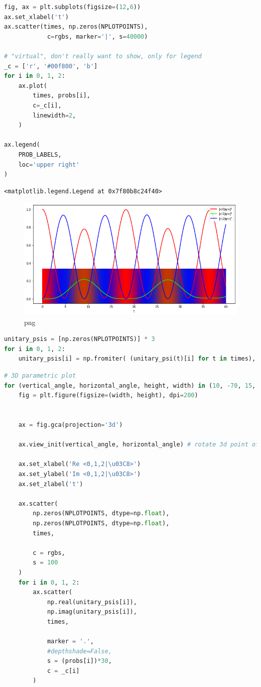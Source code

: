 \begin{lstlisting}[language=Python]
fig, ax = plt.subplots(figsize=(12,6))
ax.set_xlabel('t')
ax.scatter(times, np.zeros(NPLOTPOINTS),
            c=rgbs, marker='|', s=40000)

# "virtual", don't really want to show, only for legend
_c = ['r', '#00f800', 'b']
for i in 0, 1, 2:
    ax.plot(
        times, probs[i],
        c=_c[i],
        linewidth=2,
    )
    
ax.legend(
    PROB_LABELS,
    loc='upper right'
)
\end{lstlisting}

\begin{lstlisting}
<matplotlib.legend.Legend at 0x7f80b8c24f40>
\end{lstlisting}

\begin{figure}
\centering
\includegraphics[width=0.666\linewidth]{tex/appendix/nb/jupyter/3lev/output_20_1.png}
\caption{png}
\end{figure}

\begin{lstlisting}[language=Python]
unitary_psis = [np.zeros(NPLOTPOINTS)] * 3
for i in 0, 1, 2:
    unitary_psis[i] = np.fromiter( (unitary_psi(t)[i] for t in times), np.complex )
\end{lstlisting}

\begin{lstlisting}[language=Python]
# 3D parametric plot
for (vertical_angle, horizontal_angle, height, width) in (10, -70, 15, 35), (80, -120, 15, 35):
    fig = plt.figure(figsize=(width, height), dpi=200)


    ax = fig.gca(projection='3d')

    ax.view_init(vertical_angle, horizontal_angle) # rotate 3d point of view

    ax.set_xlabel('Re <0,1,2|\u03C8>')
    ax.set_ylabel('Im <0,1,2|\u03C8>')
    ax.set_zlabel('t')

    ax.scatter(
        np.zeros(NPLOTPOINTS, dtype=np.float),
        np.zeros(NPLOTPOINTS, dtype=np.float),
        times,

        c = rgbs,
        s = 100
    )
    for i in 0, 1, 2:
        ax.scatter(
            np.real(unitary_psis[i]),
            np.imag(unitary_psis[i]),
            times,

            marker = '.',
            #depthshade=False,
            s = (probs[i])*30,
            c = _c[i]
        )
\end{lstlisting}

